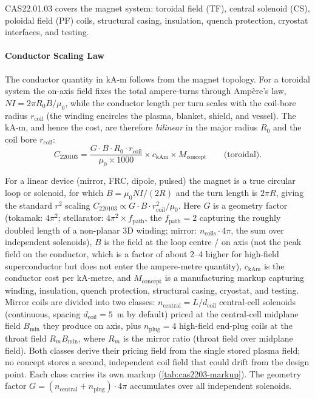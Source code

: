 \documentclass{article}
\begin{document}
CAS22.01.03 covers the magnet system: toroidal field (TF), central
solenoid (CS), poloidal field (PF) coils, structural casing,
insulation, quench protection, cryostat interfaces, and testing.

\paragraph{Conductor Scaling Law}
The conductor quantity in kA-m follows from the magnet topology. For a
toroidal system the on-axis field fixes the total ampere-turns through
Amp\`ere's law, $NI = 2\pi R_0 B / \mu_0$, while the conductor length per
turn scales with the coil-bore radius $r_{\text{coil}}$ (the winding
encircles the plasma, blanket, shield, and vessel). The kA-m, and hence
the cost, are therefore \emph{bilinear} in the major radius $R_0$ and the
coil bore $r_{\text{coil}}$:
\begin{equation}
\label{eq:cas2203}
C_{220103} = \frac{G \cdot B \cdot R_0 \cdot r_{\text{coil}}}
                   {\mu_0 \times 1000}
             \times c_{\text{kAm}}
             \times M_{\text{concept}}
             \qquad \text{(toroidal)}.
\end{equation}

\noindent For a linear device (mirror, FRC, dipole, pulsed) the magnet is
a true circular loop or solenoid, for which $B = \mu_0 N I / (2R)$ and the
turn length is $2\pi R$, giving the standard $r^2$ scaling
$C_{220103} \propto G \cdot B \cdot r_{\text{coil}}^2 / \mu_0$. Here $G$ is
a geometry factor (tokamak: $4\pi^2$; stellarator:
$4\pi^2 \times f_{\text{path}}$, the $f_{\text{path}}=2$ capturing the
roughly doubled length of a non-planar 3D winding; mirror:
$n_{\text{coils}} \cdot 4\pi$, the sum over independent solenoids), $B$ is
the field at the loop centre / on axis (not the peak field on the
conductor, which is a factor of about 2--4 higher for high-field
superconductor but does not enter the ampere-metre quantity),
$c_{\text{kAm}}$ is the conductor cost per kA-metre, and
$M_{\text{concept}}$ is a manufacturing markup capturing winding,
insulation, quench protection, structural casing, cryostat, and testing.
Mirror coils are divided into two classes: $n_{\text{central}} = L /
d_{\text{coil}}$ central-cell solenoids (continuous, spacing $d_{\text{coil}} = 5$~m
by default) priced at the central-cell midplane field $B_{\min}$ they
produce on axis, plus $n_{\text{plug}} = 4$ high-field end-plug coils at
the throat field $R_m B_{\min}$, where $R_m$ is the mirror ratio (throat
field over midplane field). Both classes derive their pricing field from
the single stored plasma field; no concept stores a second, independent
coil field that could drift from the design point. Each class carries its
own markup (\cref{tab:cas2203-markup}). The geometry factor
$G = (n_{\text{central}} + n_{\text{plug}}) \cdot 4\pi$
accumulates over all independent solenoids.
\end{document}
